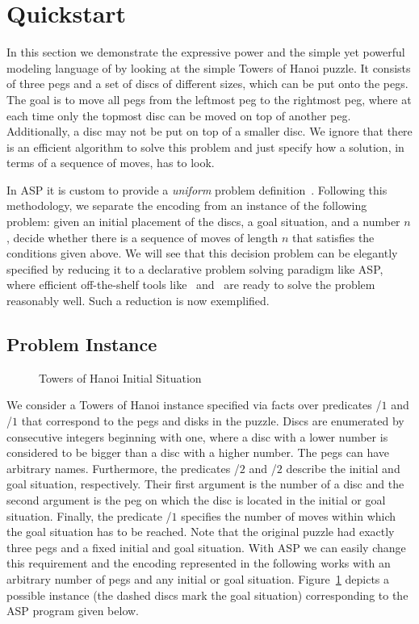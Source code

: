%
\section{Quickstart}\label{sec:quickstart}
In this section we demonstrate the expressive power 
and the simple yet powerful modeling language of \gringo{}
by looking at the simple Towers of Hanoi puzzle.
It consists of three pegs and a set of discs of different sizes, 
which can be put onto the pegs. 
The goal is to move all pegs from the leftmost peg to the rightmost peg,
where at each time only the topmost disc can be moved on top of another peg.
Additionally, a disc may not be put on top of a smaller disc.
We ignore that there is an efficient algorithm to solve this problem 
and just specify how a solution, in terms of a sequence of moves, has to look.

In ASP it is custom to provide a \emph{uniform}
problem definition~\cite{martru99a,niemela99a,schlipf95a}.
Following this methodology, we separate the encoding
from an instance of the following problem:
given an initial placement of the discs, a goal situation, and a number $n$,
decide whether there is a sequence of moves of length $n$ 
that satisfies the conditions given above.
We will see that this decision problem can be elegantly 
specified by reducing it to a declarative problem solving paradigm like ASP,
where efficient off-the-shelf tools like \gringo\ and \clasp\
are ready to solve the problem reasonably well.
Such a reduction is now exemplified.

\subsection{Problem Instance}

\begin{figure}[tb]
\centering
\hanoiInstance
\caption{Towers of Hanoi Initial Situation\label{fig:toh_inst}}
\end{figure}

We consider a Towers of Hanoi instance specified via facts over predicates
\pred{peg}/$1$ and \pred{disk}/$1$ that correspond to the pegs and disks in the puzzle.
Discs are enumerated by consecutive integers beginning with one,
where a disc with a lower number is considered to be bigger than a disc with a higher number.
The pegs can have arbitrary names. 
Furthermore, the predicates /$2$ and /$2$ describe the initial and goal situation, respectively.
Their first argument is the number of a disc and the second argument is the peg 
on which the disc is located in the initial or goal situation.
Finally, the predicate /$1$ specifies the number of moves within which the goal situation has to be reached.
Note that the original puzzle had exactly three pegs and a fixed initial and goal situation.
With ASP we can easily change this requirement and 
the encoding represented in the following works with an arbitrary number of pegs and any initial or goal situation.
Figure~\ref{fig:toh_inst} depicts a possible instance (the dashed discs mark the goal situation) 
corresponding to the ASP program given below.

